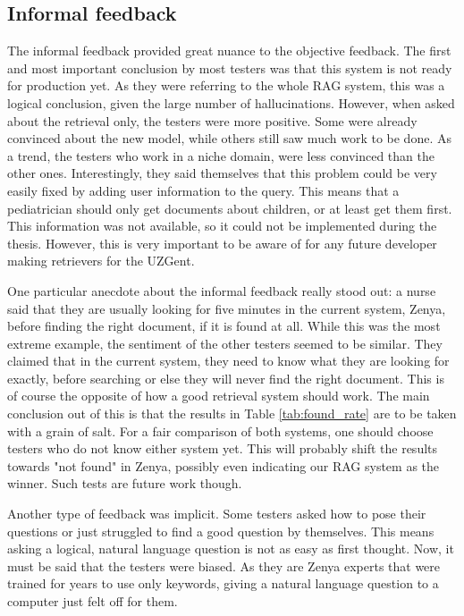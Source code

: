 \subsection{Informal feedback}
The informal feedback provided great nuance to the objective feedback. The first and most important conclusion by most testers was that this system is not ready for production yet. As they were referring to the whole RAG system, this was a logical conclusion, given the large number of hallucinations. However, when asked about the retrieval only, the testers were more positive. Some were already convinced about the new model, while others still saw much work to be done. As a trend, the testers who work in a niche domain, were less convinced than the other ones. Interestingly, they said themselves that this problem could be very easily fixed by adding user information to the query. This means that a pediatrician should only get documents about children, or at least get them first. This information was not available, so it could not be implemented during the thesis. However, this is very important to be aware of for any future developer making retrievers for the UZGent.

One particular anecdote about the informal feedback really stood out: a nurse said that they are usually looking for five minutes in the current system, Zenya, before finding the right document, if it is found at all. While this was the most extreme example, the sentiment of the other testers seemed to be similar. They claimed that in the current system, they need to know what they are looking for exactly, before searching or else they will never find the right document. This is of course the opposite of how a good retrieval system should work. The main conclusion out of this is that the results in Table \ref{tab:found_rate} are to be taken with a grain of salt. For a fair comparison of both systems, one should choose testers who do not know either system yet. This will probably shift the results towards "not found" in Zenya, possibly even indicating our RAG system as the winner. Such tests are future work though.

Another type of feedback was implicit. Some testers asked how to pose their questions or just struggled to find a good question by themselves. This means asking a logical, natural language question is not as easy as first thought. Now, it must be said that the testers were biased. As they are Zenya experts that were trained for years to use only keywords, giving a natural language question to a computer just felt off for them.

